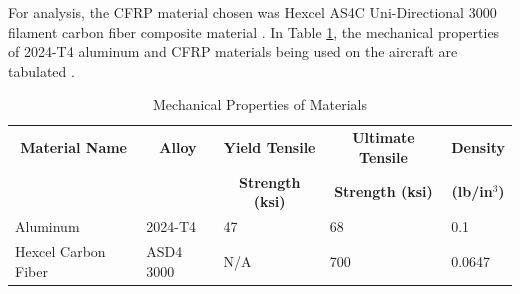 


For analysis, the CFRP material chosen was Hexcel AS4C Uni-Directional 3000 filament carbon fiber composite material \cite{hexcel}. In Table \ref{tab:material_properties}, the mechanical properties of 2024-T4 aluminum and CFRP materials being used on the aircraft are tabulated \cite{aluminum}.

\begin{table}[!h]
\centering
\caption{Mechanical Properties of Materials}
\begin{tabular}{|p{3cm}||p{2cm}|p{2.5cm}|p{2.5cm}|p{2cm}| }
\toprule
\multicolumn{1}{|c||}{\textbf{Material Name}} & \multicolumn{1}{c|}{\textbf{Alloy}} &  
\multicolumn{1}{c|}{\textbf{Yield Tensile}} & \multicolumn{1}{c|}{\textbf{Ultimate Tensile}} & \multicolumn{1}{c|}{\textbf{Density}} \\ 
\multicolumn{1}{|c||}{\textbf{}} & \multicolumn{1}{c|}{} &  
\multicolumn{1}{c|}{\textbf{Strength (ksi)}} & \multicolumn{1}{c|}{\textbf{Strength (ksi)}} & \multicolumn{1}{c|}{\textbf{(lb/in$^3$)}} \\ \hline \hline
Aluminum & 2024-T4 & 47 & 68 & 0.1 \\ \hline
Hexcel Carbon Fiber & ASD4 3000 & N/A & 700 & 0.0647 \\
\bottomrule
\end{tabular}
\label{tab:material_properties}
\end{table}


